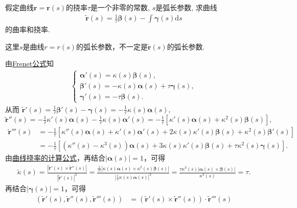 \documentclass[../../main.tex]{subfiles}%
\begin{document}
\begin{example}
假定曲线$\bm{r} = \bm{r}(s)$的挠率$\tau$是一个非零的常数, $s$是弧长参数, 求曲线
\begin{align*}
\tilde{\bm{r}}(s) = \frac{1}{\tau}\bm{\beta}(s) - \int \bm{\gamma}(s)\mathrm{d}s
\end{align*}
的曲率和挠率.
\end{example}
\begin{remark}
这里$s$是曲线$r=r(s)$的弧长参数，不一定是$\tilde{\bm{r}}(s)$的弧长参数.
\end{remark}
\begin{solution}

由\hyperref[theorem:微分几何-Frenet公式]{Frenet公式}知
\begin{align*}
\begin{cases}
\bm{\alpha}'(s) = \kappa(s)\bm{\beta}(s),\\
\bm{\beta}'(s) = -\kappa(s)\bm{\alpha}(s) + \tau\bm{\gamma}(s),\\
\bm{\gamma}'(s) = -\tau\bm{\beta}(s).
\end{cases}
\end{align*}
从而
$\widetilde{\bm{r}}'(s) = \frac{1}{\tau}\bm{\beta}'(s) - \bm{\gamma}(s) = -\frac{1}{\tau}\kappa(s)\bm{\alpha}(s),$
$\widetilde{\bm{r}}''(s) = -\frac{1}{\tau}\kappa'(s)\bm{\alpha}(s) - \frac{1}{\tau}\kappa(s)\bm{\alpha}'(s) = -\frac{1}{\tau}\left[\kappa'(s)\bm{\alpha}(s) + \kappa^2(s)\bm{\beta}(s)\right],$
\begin{align*}
\widetilde{\bm{r}}'''(s) &= -\frac{1}{\tau}\left[\kappa''(s)\bm{\alpha}(s) + \kappa'(s)\bm{\alpha}'(s) + 2\kappa(s)\kappa'(s)\bm{\beta}(s) + \kappa^2(s)\bm{\beta}'(s)\right]\\
&= -\frac{1}{\tau}\left[\left(\kappa''(s) - \kappa^3(s)\right)\bm{\alpha}(s) + 3\kappa(s)\kappa'(s)\bm{\beta}(s) + \tau\kappa^2(s)\bm{\gamma}(s)\right].
\end{align*}
由\hyperref[theorem:微分几何-曲线挠率的计算公式]{曲线挠率的计算公式}，再结合$|\bm{\alpha}(s)|=1$，可得
\begin{align*}
\widetilde{\kappa}(s) = \frac{|\widetilde{\bm{r}}'(s) \times \widetilde{\bm{r}}''(s)|}{|\widetilde{\bm{r}}'(s)|^3} = \frac{\frac{1}{\tau^2}|\kappa(s)\bm{\alpha}(s) \times \kappa^2(s)\bm{\beta}(s)|}{\left|\frac{1}{\tau}\kappa(s)\bm{\alpha}(s)\right|^3} = \frac{\tau\kappa^3(s)|\bm{\alpha}(s) \times \bm{\beta}(s)|}{\kappa^3(s)} = \tau.
\end{align*}
再结合$|\bm{\gamma}(s)|=1$，可得
\begin{align*}
\left(\widetilde{\bm{r}}'(s), \widetilde{\bm{r}}''(s), \widetilde{\bm{r}}'''(s)\right) &= \left(\widetilde{\bm{r}}'(s) \times \widetilde{\bm{r}}''(s)\right) \cdot \widetilde{\bm{r}}'''(s)\\

\end{align*}
\end{solution}
\end{document}
